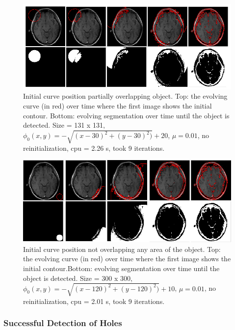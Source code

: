 \documentclass[10pt,twocolumn,letterpaper]{article}
\begin{document}
\begin{figure}[t]
\centering
\includegraphics[width=12cm]{cv_eg3.png}
\caption{Initial curve position partially overlapping object. Top: the evolving curve (in red) over time where the first image shows the initial contour.
Bottom: evolving segmentation over time until the object is detected. Size = 131 x 131, $\phi_{0}(x,y) = - \sqrt{(x - 30)^2 + (y - 30)^2)} + 20$, $\mu =
0.01$, no reinitialization, cpu = 2.26 s, took 9 iterations.}
\label{fig:cv_eg3}
\end{figure}

\begin{figure}[t]
\centering
\includegraphics[width=12cm]{cv_eg4.png}
\caption{Initial curve position not overlapping any area of the object. Top: the evolving curve (in red) over time where the first image shows the initial
contour.Bottom: evolving segmentation over time until the object is detected. Size = 300 x 300, $\phi_{0}(x,y) = - \sqrt{(x - 120)^2 + (y - 120)^2)} + 10$,
$\mu =0.01$, no reinitialization, cpu = 2.01 s, took 9 iterations.}
\label{fig:cv_eg4}
\end{figure}

\subsubsection*{Successful Detection of Holes}
\end{document}
